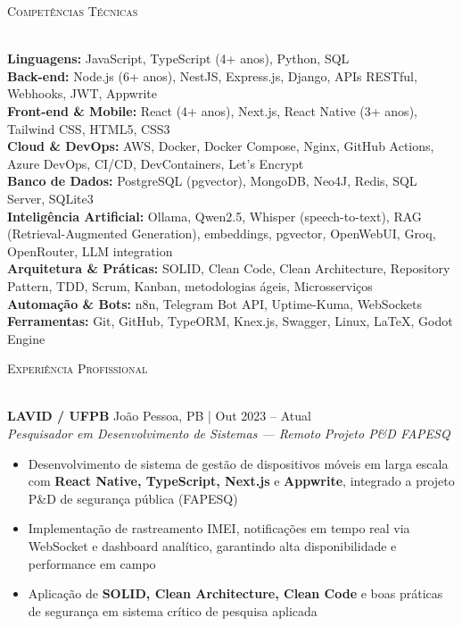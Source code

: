 \documentclass[a4paper]{article}
\newcommand{\lineunder}{
    \vspace*{-8pt} \\
    \hspace*{-18pt} \hrulefill \\
}
\newcommand{\header}[1]{
    {\hspace*{-18pt}\vspace*{6pt} \textsc{#1}}
    \vspace*{-6pt} \lineunder
}
\begin{document}
\header{Competências Técnicas}
\vspace{2mm}

\textbf{Linguagens:} JavaScript, TypeScript (4+ anos), Python, SQL\\
\vspace{1mm}
\textbf{Back-end:} Node.js (6+ anos), NestJS, Express.js, Django, APIs RESTful, Webhooks, JWT, Appwrite\\
\vspace{1mm}
\textbf{Front-end \& Mobile:} React (4+ anos), Next.js, React Native (3+ anos), Tailwind CSS, HTML5, CSS3\\
\vspace{1mm}
\textbf{Cloud \& DevOps:} AWS, Docker, Docker Compose, Nginx, GitHub Actions, Azure DevOps, CI/CD, DevContainers, Let's Encrypt\\
\vspace{1mm}
\textbf{Banco de Dados:} PostgreSQL (pgvector), MongoDB, Neo4J, Redis, SQL Server, SQLite3\\
\vspace{1mm}
\textbf{Intelig\^{e}ncia Artificial:} Ollama, Qwen2.5, Whisper (speech-to-text), RAG (Retrieval-Augmented Generation), embeddings, pgvector, OpenWebUI, Groq, OpenRouter, LLM integration\\
\vspace{1mm}
\textbf{Arquitetura \& Pr\'{a}ticas:} SOLID, Clean Code, Clean Architecture, Repository Pattern, TDD, Scrum, Kanban, metodologias \'{a}geis, Microsservi\c{c}os\\
\vspace{1mm}
\textbf{Automa\c{c}\~{a}o \& Bots:} n8n, Telegram Bot API, Uptime-Kuma, WebSockets\\
\vspace{1mm}
\textbf{Ferramentas:} Git, GitHub, TypeORM, Knex.js, Swagger, Linux, LaTeX, Godot Engine\\

\vspace{3mm}

\header{Experiência Profissional}
\vspace{2mm}

\textbf{LAVID / UFPB} \hfill João Pessoa, PB | Out 2023 -- Atual\\
\textit{Pesquisador em Desenvolvimento de Sistemas — Remoto} \hfill \textit{Projeto P\&D FAPESQ}\\
\vspace{-3mm}
\begin{itemize}[leftmargin=*, itemsep=-3pt]
    \item Desenvolvimento de sistema de gestão de dispositivos móveis em larga escala com \textbf{React Native, TypeScript, Next.js} e \textbf{Appwrite}, integrado a projeto P\&D de segurança pública (FAPESQ)
    \item Implementação de rastreamento IMEI, notificações em tempo real via WebSocket e dashboard analítico, garantindo alta disponibilidade e performance em campo
    \item Aplicação de \textbf{SOLID, Clean Architecture, Clean Code} e boas práticas de segurança em sistema crítico de pesquisa aplicada
\end{itemize}
\end{document}
